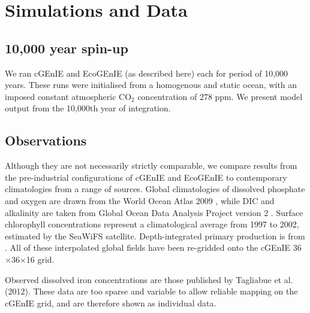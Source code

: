 \documentclass[gmd, manuscript]{copernicus}
\begin{document}
{%
\section{Simulations and Data}\label{SimData}

\subsection{10,000 year spin-up}

We ran cGEnIE \citep[as configured and described in][]{Ridgwell:prep} and EcoGEnIE (as described here) each for period of 10,000 years. These runs were initialised from a homogenous and static ocean, with an imposed constant atmospheric CO$_2$ concentration of 278 ppm. We present model output from the 10,000th year of integration. 

\subsection{Observations}

 Although they are not necessarily strictly comparable, we compare results from the pre-industrial configurations of cGEnIE and EcoGEnIE to contemporary climatologies from a range of sources. Global climatologies of dissolved phosphate and oxygen are drawn from the World Ocean Atlas 2009 \citep[WOA09 -][]{Garcia:2010}, while DIC and alkalinity are taken from Global Ocean Data Analysis Project version 2 \citep[GLODAPv2 -][]{Olsen:2016}. Surface chlorophyll concentrations represent a climatological average from 1997 to 2002, estimated by the SeaWiFS satellite. Depth-integrated primary production is from \citet{Behrenfeld:1997}. All of these interpolated global fields have been re-gridded onto the cGEnIE 36\(\times\)36\(\times\)16 grid.

Observed dissolved iron concentrations are those published by Tagliabue et al. (2012). These data are too sparse and variable to allow reliable mapping on the cGEnIE grid, and are therefore shown as individual data.

}
\end{document}
